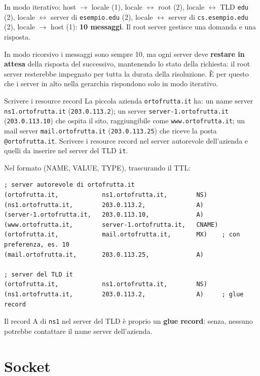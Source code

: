 \svolgimento
In modo iterativo: host $\rightarrow$ locale (1), locale $\leftrightarrow$ root (2), locale $\leftrightarrow$ TLD \texttt{edu} (2),
locale $\leftrightarrow$ server di \texttt{esempio.edu} (2), locale $\leftrightarrow$ server di \texttt{cs.esempio.edu} (2),
locale $\rightarrow$ host (1): \textbf{10 messaggi}. Il root server gestisce una domanda e una risposta.

In modo ricorsivo i messaggi sono sempre 10, ma ogni server deve \textbf{restare in attesa} della risposta del successivo,
mantenendo lo stato della richiesta: il root server resterebbe impegnato per tutta la durata della risoluzione. È per questo
che i server in alto nella gerarchia rispondono solo in modo iterativo.

\begin{esercizio}{Scrivere i resource record}
La piccola azienda \texttt{ortofrutta.it} ha: un name server \texttt{ns1.ortofrutta.it} (\texttt{203.0.113.2}); un server
\texttt{server-1.ortofrutta.it} (\texttt{203.0.113.10}) che ospita il sito, raggiungibile come \texttt{www.ortofrutta.it}; un
mail server \texttt{mail.ortofrutta.it} (\texttt{203.0.113.25}) che riceve la posta \texttt{@ortofrutta.it}. Scrivere i resource
record nel server autorevole dell'azienda e quelli da inserire nel server del TLD \texttt{it}.
\end{esercizio}

\svolgimento
Nel formato (NAME, VALUE, TYPE), trascurando il TTL:
\begin{lstlisting}
; server autorevole di ortofrutta.it
(ortofrutta.it,            ns1.ortofrutta.it,        NS)
(ns1.ortofrutta.it,        203.0.113.2,              A)
(server-1.ortofrutta.it,   203.0.113.10,             A)
(www.ortofrutta.it,        server-1.ortofrutta.it,   CNAME)
(ortofrutta.it,            mail.ortofrutta.it,       MX)    ; con preferenza, es. 10
(mail.ortofrutta.it,       203.0.113.25,             A)

; server del TLD it
(ortofrutta.it,            ns1.ortofrutta.it,        NS)
(ns1.ortofrutta.it,        203.0.113.2,              A)     ; glue record
\end{lstlisting}
Il record A di \texttt{ns1} nel server del TLD è proprio un \textbf{glue record}: senza, nessuno potrebbe contattare il name
server dell'azienda.

\section{Socket}

